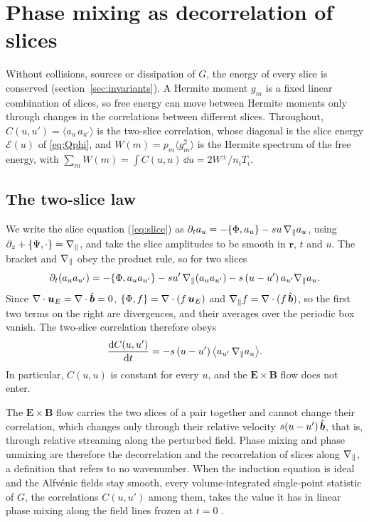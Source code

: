 \section{Phase mixing as decorrelation of slices}\label{sec:decorrelation}

Without collisions, sources or dissipation of $G$, the energy of every slice is conserved (section~\ref{sec:invariants}). A Hermite moment $g_m$ is a fixed linear combination of slices, so free energy can move between Hermite moments only through changes in the correlations between different slices. Throughout, $C(u,u')=\langle a_u\,a_{u'}\rangle$ is the two-slice correlation, whose diagonal is the slice energy $\mathcal E(u)$ of \eqref{eq:Qphi}, and $W(m)=p_m\langle g_m^2\rangle$ is the Hermite spectrum of the free energy, with $\sum_mW(m)=\int C(u,u)\,\dd u=2W^\pm/n_iT_i$.

\subsection{The two-slice law}\label{dec:sec-twoslice}

We write the slice equation (\ref{eq:slice}) as $\partial_ta_u=-\{\Phi,a_u\}-su\,\nabla_\parallel a_u$, using $\partial_z+\{\Psi,\cdot\}=\nabla_\parallel$, and take the slice amplitudes to be smooth in $\boldsymbol r$, $t$ and $u$. The bracket and $\nabla_\parallel$ obey the product rule, so for two slices
\begin{equation*}
  \partial_t(a_ua_{u'})=-\{\Phi,a_ua_{u'}\}-su'\,\nabla_\parallel(a_ua_{u'})-s\,(u-u')\,a_{u'}\nabla_\parallel a_u .
\end{equation*}
Since $\nabla\cdot\boldsymbol u_E=\nabla\cdot\hat{\boldsymbol b}=0$, $\{\Phi,f\}=\nabla\cdot(f\,\boldsymbol u_E)$ and $\nabla_\parallel f=\nabla\cdot(f\,\hat{\boldsymbol b})$, so the first two terms on the right are divergences, and their averages over the periodic box vanish. The two-slice correlation therefore obeys
\begin{equation}\label{eq:twoslice}
  \frac{\mathrm{d} C(u,u')}{\mathrm{d} t}=-s\,(u-u')\,\big\langle a_{u'}\,\nabla_\parallel a_u\big\rangle .
\end{equation}
In particular, $C(u,u)$ is constant for every $u$, and the $\boldsymbol E\times\boldsymbol B$ flow does not enter.

The $\boldsymbol E\times\boldsymbol B$ flow carries the two slices of a pair together and cannot change their correlation, which changes only through their relative velocity $s(u-u')\,\hat{\boldsymbol b}$, that is, through relative streaming along the perturbed field. Phase mixing and phase unmixing are therefore the decorrelation and the recorrelation of slices along $\nabla_\parallel$, a definition that refers to no wavenumber. When the induction equation is ideal and the Alfv\'enic fields stay smooth, every volume-integrated single-point statistic of $G$, the correlations $C(u,u')$ among them, takes the value it has in linear phase mixing along the field lines frozen at $t=0$ \citep{KanekarPrep}.

